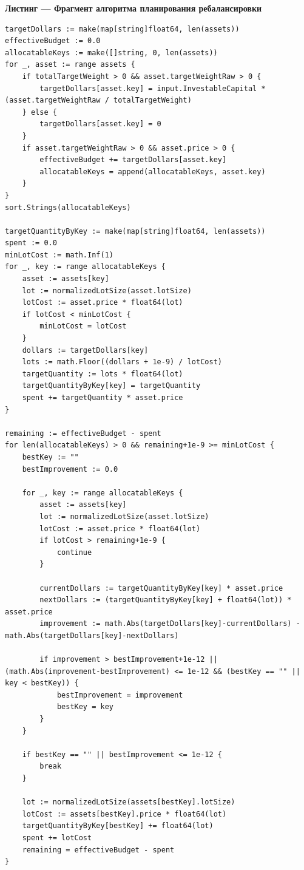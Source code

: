 \documentclass[14pt]{gost-7-32}
\newcounter{codelisting}
\newcommand{\codelistingcaption}[1]{%
  \refstepcounter{codelisting}%
  \noindent\textbf{Листинг \thecodelisting{} --- #1}\par\vspace{0.4em}%
}
\begin{document}
\codelistingcaption{Фрагмент алгоритма планирования ребалансировки}
\begin{lstlisting}
targetDollars := make(map[string]float64, len(assets))
effectiveBudget := 0.0
allocatableKeys := make([]string, 0, len(assets))
for _, asset := range assets {
    if totalTargetWeight > 0 && asset.targetWeightRaw > 0 {
        targetDollars[asset.key] = input.InvestableCapital * (asset.targetWeightRaw / totalTargetWeight)
    } else {
        targetDollars[asset.key] = 0
    }
    if asset.targetWeightRaw > 0 && asset.price > 0 {
        effectiveBudget += targetDollars[asset.key]
        allocatableKeys = append(allocatableKeys, asset.key)
    }
}
sort.Strings(allocatableKeys)

targetQuantityByKey := make(map[string]float64, len(assets))
spent := 0.0
minLotCost := math.Inf(1)
for _, key := range allocatableKeys {
    asset := assets[key]
    lot := normalizedLotSize(asset.lotSize)
    lotCost := asset.price * float64(lot)
    if lotCost < minLotCost {
        minLotCost = lotCost
    }
    dollars := targetDollars[key]
    lots := math.Floor((dollars + 1e-9) / lotCost)
    targetQuantity := lots * float64(lot)
    targetQuantityByKey[key] = targetQuantity
    spent += targetQuantity * asset.price
}

remaining := effectiveBudget - spent
for len(allocatableKeys) > 0 && remaining+1e-9 >= minLotCost {
    bestKey := ""
    bestImprovement := 0.0

    for _, key := range allocatableKeys {
        asset := assets[key]
        lot := normalizedLotSize(asset.lotSize)
        lotCost := asset.price * float64(lot)
        if lotCost > remaining+1e-9 {
            continue
        }

        currentDollars := targetQuantityByKey[key] * asset.price
        nextDollars := (targetQuantityByKey[key] + float64(lot)) * asset.price
        improvement := math.Abs(targetDollars[key]-currentDollars) - math.Abs(targetDollars[key]-nextDollars)

        if improvement > bestImprovement+1e-12 || (math.Abs(improvement-bestImprovement) <= 1e-12 && (bestKey == "" || key < bestKey)) {
            bestImprovement = improvement
            bestKey = key
        }
    }

    if bestKey == "" || bestImprovement <= 1e-12 {
        break
    }

    lot := normalizedLotSize(assets[bestKey].lotSize)
    lotCost := assets[bestKey].price * float64(lot)
    targetQuantityByKey[bestKey] += float64(lot)
    spent += lotCost
    remaining = effectiveBudget - spent
}
\end{lstlisting}
\end{document}
